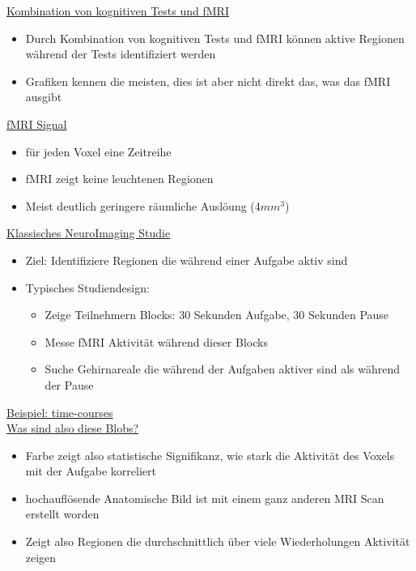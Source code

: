 \documentclass[a4paper,10pt,oneside]{article}
\begin{document}
\underline{Kombination von kognitiven Tests und fMRI} \\
	\begin{itemize}
		\item Durch Kombination von kognitiven Tests und fMRI können aktive Regionen während der Tests identifiziert werden
		\item Grafiken kennen die meisten, dies ist aber nicht direkt das, was das fMRI ausgibt
	\end{itemize}

\underline{fMRI Signal} \\
	\begin{itemize}
		\item für jeden Voxel eine Zeitreihe
		\item fMRI zeigt keine leuchtenen Regionen
		\item Meist deutlich geringere räumliche Auslöung (4$mm^3$)
	\end{itemize}

\underline{Klassisches NeuroImaging Studie} \\
	\begin{itemize}
		\item Ziel: Identifiziere Regionen die während einer Aufgabe aktiv sind
		\item Typisches Studiendesign:
			\begin{itemize}
				\item Zeige Teilnehmern Blocks: 30 Sekunden Aufgabe, 30 Sekunden Pause
				\item Messe fMRI Aktivität während dieser Blocks
				\item Suche Gehirnareale die während der Aufgaben aktiver sind als während der Pause
			\end{itemize}
	\end{itemize}

\underline{Beispiel: time-courses} \\

\underline{Was sind also diese Blobs?} \\
	\begin{itemize}
		\item Farbe zeigt also statistische Signifikanz, wie stark die Aktivität des Voxels mit der Aufgabe korreliert
		\item hochauflösende Anatomische Bild ist mit einem ganz anderen MRI Scan erstellt worden 
		\item Zeigt also Regionen die durchschnittlich über viele Wiederholungen Aktivität zeigen
	\end{itemize}
	
\end{document}
